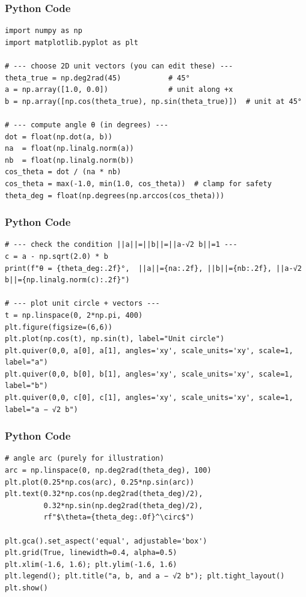 \documentclass{beamer}
\begin{document}
    \begin{frame}[fragile]
    \frametitle{Python Code}
    \begin{lstlisting}
import numpy as np
import matplotlib.pyplot as plt

# --- choose 2D unit vectors (you can edit these) ---
theta_true = np.deg2rad(45)           # 45°
a = np.array([1.0, 0.0])              # unit along +x
b = np.array([np.cos(theta_true), np.sin(theta_true)])  # unit at 45°

# --- compute angle θ (in degrees) ---
dot = float(np.dot(a, b))
na  = float(np.linalg.norm(a))
nb  = float(np.linalg.norm(b))
cos_theta = dot / (na * nb)
cos_theta = max(-1.0, min(1.0, cos_theta))  # clamp for safety
theta_deg = float(np.degrees(np.arccos(cos_theta)))
    \end{lstlisting}
    \end{frame}
    \begin{frame}[fragile]
    \frametitle{Python Code}
    \begin{lstlisting}
# --- check the condition ||a||=||b||=||a-√2 b||=1 ---
c = a - np.sqrt(2.0) * b
print(f"θ = {theta_deg:.2f}°,  ||a||={na:.2f}, ||b||={nb:.2f}, ||a-√2 b||={np.linalg.norm(c):.2f}")

# --- plot unit circle + vectors ---
t = np.linspace(0, 2*np.pi, 400)
plt.figure(figsize=(6,6))
plt.plot(np.cos(t), np.sin(t), label="Unit circle")
plt.quiver(0,0, a[0], a[1], angles='xy', scale_units='xy', scale=1, label="a")
plt.quiver(0,0, b[0], b[1], angles='xy', scale_units='xy', scale=1, label="b")
plt.quiver(0,0, c[0], c[1], angles='xy', scale_units='xy', scale=1, label="a − √2 b")
\end{lstlisting}
    \end{frame}
    \begin{frame}[fragile]
    \frametitle{Python Code}
    \begin{lstlisting}
# angle arc (purely for illustration)
arc = np.linspace(0, np.deg2rad(theta_deg), 100)
plt.plot(0.25*np.cos(arc), 0.25*np.sin(arc))
plt.text(0.32*np.cos(np.deg2rad(theta_deg)/2),
         0.32*np.sin(np.deg2rad(theta_deg)/2),
         rf"$\theta={theta_deg:.0f}^\circ$")

plt.gca().set_aspect('equal', adjustable='box')
plt.grid(True, linewidth=0.4, alpha=0.5)
plt.xlim(-1.6, 1.6); plt.ylim(-1.6, 1.6)
plt.legend(); plt.title("a, b, and a − √2 b"); plt.tight_layout()
plt.show()

    \end{lstlisting}
    \end{frame}
\end{document}
